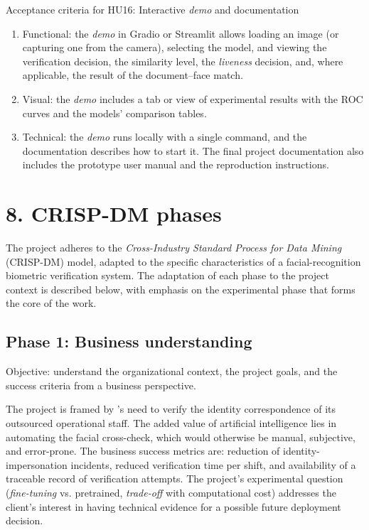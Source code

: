 \documentclass[
  11pt, %
]{charter}
\begin{document}
Acceptance criteria for HU16: Interactive \textit{demo} and documentation
\begin{enumerate}
  \item Functional: the \textit{demo} in Gradio or Streamlit allows loading an image (or capturing one from the camera), selecting the model, and viewing the verification decision, the similarity level, the \textit{liveness} decision, and, where applicable, the result of the document--face match.
  \item Visual: the \textit{demo} includes a tab or view of experimental results with the ROC curves and the models' comparison tables.
  \item Technical: the \textit{demo} runs locally with a single command, and the documentation describes how to start it. The final project documentation also includes the prototype user manual and the reproduction instructions.
\end{enumerate}

\section{8. CRISP-DM phases}
\label{sec:crispdm}

The project adheres to the \textit{Cross-Industry Standard Process for Data Mining} (CRISP-DM) model, adapted to the specific characteristics of a facial-recognition biometric verification system. The adaptation of each phase to the project context is described below, with emphasis on the experimental phase that forms the core of the work.

\subsection{Phase 1: Business understanding}

Objective: understand the organizational context, the project goals, and the success criteria from a business perspective.

The project is framed by \empclientename's\hspace{1px} need to verify the identity correspondence of its outsourced operational staff. The added value of artificial intelligence lies in automating the facial cross-check, which would otherwise be manual, subjective, and error-prone. The business success metrics are: reduction of identity-impersonation incidents, reduced verification time per shift, and availability of a traceable record of verification attempts. The project's experimental question (\textit{fine-tuning} vs. pretrained, \textit{trade-off} with computational cost) addresses the client's interest in having technical evidence for a possible future deployment decision.
\end{document}
